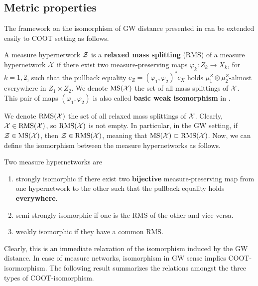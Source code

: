\subsection{Metric properties}
The framework on the isomorphism of GW distance presented in 
can be extended easily to COOT setting as follows.
\begin{definition}
  A measure hypernetwork $\mathcal Z$ is a \textbf{relaxed mass splitting} (RMS) of a
  measure hypernetwork $\mathcal X$ if there exist two measure-preserving maps
  $\varphi_k: Z_k \to X_k$, for $k=1,2$, such that the pullback equality
  $c_Z = (\varphi_1, \varphi_2)^*c_X$ holds $\mu^Z_1 \otimes \mu_2^Z$-almost everywhere
  in $Z_1 \times Z_2$. We denote $\text{MS}(\mathcal X)$ the set of all mass splittings
  of $\mathcal X$. This pair of maps $(\varphi_1, \varphi_2)$ is also called
  \textbf{basic weak isomorphism} in \citep{Chowdhury21b}.
\end{definition}
We denote $\text{RMS}(\mathcal X)$ the set of all relaxed mass splittings of $\mathcal X$. Clearly,
$\mathcal X \in \text{RMS}(\mathcal X)$, so $\text{RMS}(\mathcal X)$ is not empty.
In particular, in the GW setting, if $\mathcal Z \in \text{MS}(\mathcal X)$, then $\mathcal Z \in \text{RMS}(\mathcal X)$, meaning that
$\text{MS}(\mathcal X) \subset \text{RMS}(\mathcal X)$. Now, we can define the isomorphism between the measure hypernetworks
as follows.
\begin{definition} \label{coot_isomorphic}
  Two measure hypernetworks are
  \begin{enumerate}
    \item strongly isomorphic if there exist two \textbf{bijective}
    measure-preserving map from one hypernetwork to the other such that the pullback equality holds
    \textbf{everywhere}.
    \item semi-strongly isomorphic if one is the RMS of the other and vice versa.
    \item weakly isomorphic if they have a common RMS.
  \end{enumerate}
\end{definition}
Clearly, this is an immediate relaxation of the isomorphism induced by the GW distance.
In case of measure networks, isomorphism in GW sense implies COOT-isormorphism.
The following result summarizes the relations amongst the three types of COOT-isomorphism.
